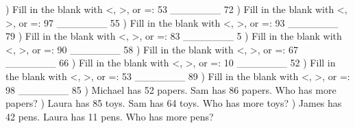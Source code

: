 \documentclass{article}%
\begin{document}
\newline%
) Fill in the blank with <, >, or =: 53 \_\_\_\_\_\_\_ 72%
\newline%
\newline%
) Fill in the blank with <, >, or =: 97 \_\_\_\_\_\_\_ 55%
\newline%
\newline%
) Fill in the blank with <, >, or =: 93 \_\_\_\_\_\_\_ 79%
\newline%
\newline%
) Fill in the blank with <, >, or =: 83 \_\_\_\_\_\_\_ 5%
\newline%
\newline%
) Fill in the blank with <, >, or =: 90 \_\_\_\_\_\_\_ 58%
\newline%
\newline%
) Fill in the blank with <, >, or =: 67 \_\_\_\_\_\_\_ 66%
\newline%
\newline%
) Fill in the blank with <, >, or =: 10 \_\_\_\_\_\_\_ 52%
\newline%
\newline%
) Fill in the blank with <, >, or =: 53 \_\_\_\_\_\_\_ 89%
\newline%
\newline%
) Fill in the blank with <, >, or =: 98 \_\_\_\_\_\_\_ 85%
\newline%
\newline%
) Michael has 52 papers. Sam has 86 papers. Who has more papers?%
\newline%
\newline%
) Laura has 85 toys. Sam has 64 toys. Who has more toys?%
\newline%
\newline%
) James has 42 pens. Laura has 11 pens. Who has more pens?%
\newline%
\newline%
\newline%
\end{document}
